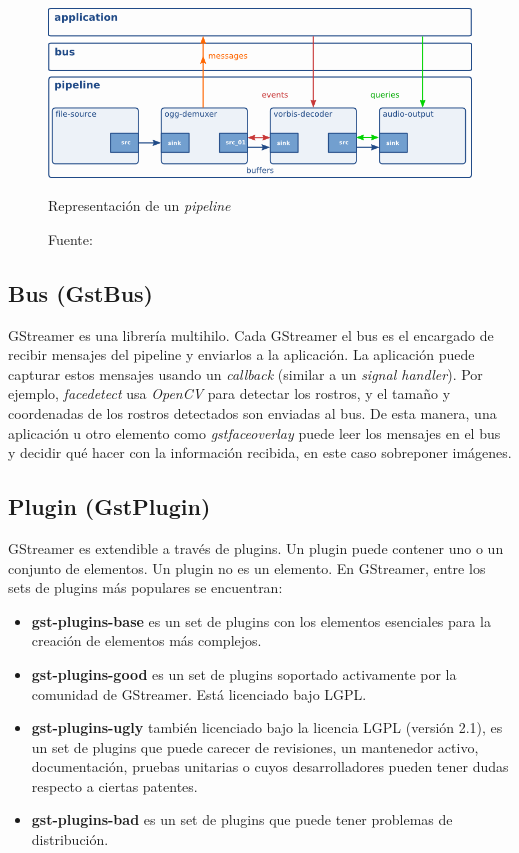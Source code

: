\documentclass[a4paper,openright,12pt]{report}
\begin{document}
\begin{figure}[h]
  \centering
    \includegraphics[width=\textwidth]{../images/ad-pipeline.png}\par
  \caption{Representación de un \textit{pipeline}}
  \caption*{Fuente: \cite{taymans2016gstreamer}}
\end{figure}

\subsection{Bus (GstBus)}
GStreamer es una librería multihilo. Cada GStreamer el bus es el encargado de
recibir mensajes del pipeline y enviarlos a la aplicación. La aplicación puede
capturar estos mensajes usando un \textit{callback} (similar a un
\textit{signal handler}). Por ejemplo, \textit{facedetect} usa \textit{OpenCV}
para detectar los rostros, y el tamaño y coordenadas de los rostros detectados
son enviadas al bus. De esta manera, una aplicación u otro elemento como
\textit{gstfaceoverlay} puede leer los mensajes en el bus y decidir qué hacer
con la información recibida, en este caso sobreponer imágenes.
\subsection{Plugin (GstPlugin)}
GStreamer es extendible a través de plugins. Un plugin puede contener uno o un
conjunto de elementos. Un plugin no es un elemento. En GStreamer, entre los
sets de plugins más populares se encuentran:
\begin{itemize}
\item \textbf{gst-plugins-base} es un set de plugins con los elementos esenciales para
la creación de elementos más complejos.
\item \textbf{gst-plugins-good} es un set de plugins soportado activamente por
la comunidad de GStreamer. Está licenciado bajo LGPL.
\item \textbf{gst-plugins-ugly} también licenciado bajo la licencia LGPL
(versión 2.1), es un set de plugins que puede carecer de revisiones, un
mantenedor activo, documentación, pruebas unitarias o cuyos desarrolladores
pueden tener dudas respecto a ciertas patentes.
\item \textbf{gst-plugins-bad} es un set de plugins que puede tener problemas
de distribución.
\end{itemize}
\end{document}
